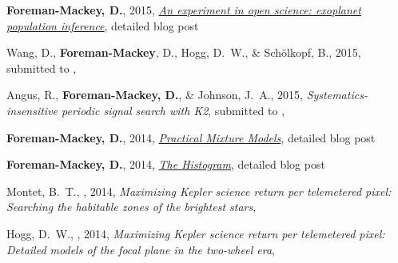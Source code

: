 \item {\bf Foreman-Mackey, D.}, 2015,
    \href{http://dan.iel.fm/posts/exopop/}
         {\emph{An experiment in open science: exoplanet population
                inference}},
    detailed blog post

\item Wang, D., {\bf Foreman-Mackey}, D., Hogg, D.~W., \& Sch{\"o}lkopf, B.,
    2015, submitted to \pasp, 

\item Angus, R., {\bf Foreman-Mackey, D.}, \& Johnson, J.~A., 2015,
    \emph{Systematics-insensitive periodic signal search with K2},
    submitted to \apj, 

\item {\bf Foreman-Mackey, D.}, 2014,
    \href{http://dan.iel.fm/posts/mixture-models/}
         {\emph{Practical Mixture Models}},
    detailed blog post

\item {\bf Foreman-Mackey, D.}, 2014,
    \href{http://dan.iel.fm/posts/histogram1/}
         {\emph{The Histogram}},
    detailed blog post

\item Montet, B.~T., \etal, 2014,
    \emph{Maximizing Kepler science return per telemetered pixel: Searching
          the habitable zones of the brightest stars},

\item Hogg, D.~W., \etal, 2014,
    \emph{Maximizing Kepler science return per telemetered pixel: Detailed
          models of the focal plane in the two-wheel era},
